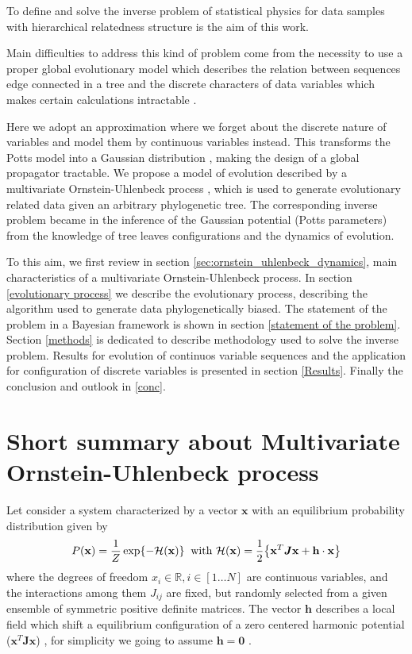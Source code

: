 \documentclass[reprint,amsmath,amssymb,superscriptaddress,showpacs,pre]{revtex4-1}
\let\originalleft\left
\let\originalright\right
\renewcommand{\left}{\mathopen{}\mathclose\bgroup\originalleft}
\renewcommand{\right}{\aftergroup\egroup\originalright}
\newcommand{\Ham}{\mathcal{H}}
\def\Jij{J_{ij}}
\begin{document}
 To define and solve the inverse problem of statistical physics for data samples with hierarchical  relatedness structure is the aim of this work. 

Main difficulties to address  this kind of problem  come from the necessity to use  a proper global evolutionary model which describes the relation between sequences edge connected in a tree and the discrete  characters of data variables which makes certain calculations intractable \cite{entropy_paper}. 

Here we  adopt an approximation where we forget about the discrete nature of variables and model them by continuous variables instead. This transforms the Potts model into a Gaussian distribution \cite{Baldassi}, making the design of a global propagator tractable. We propose a model of evolution described by a multivariate Ornstein-Uhlenbeck process \cite{gardiner}, which is used  to generate evolutionary related data given an arbitrary phylogenetic tree. The corresponding inverse problem became in the inference of the Gaussian potential (Potts parameters) from the knowledge of tree leaves configurations and the dynamics of evolution. 

To this aim, we first review in section \ref{sec:ornstein_uhlenbeck_dynamics}, main characteristics of a multivariate Ornstein-Uhlenbeck process. In section \ref{evolutionary process} we describe the evolutionary process, describing the algorithm used to generate data phylogenetically biased. The statement of the problem in a Bayesian framework is shown in section \ref{statement of the problem}. Section \ref{methods} is dedicated to describe methodology used to solve the inverse problem. Results for evolution of continuos variable sequences and  the application for configuration of discrete variables is presented in section \ref{Results}. Finally the conclusion and outlook in \ref{conc}.

\section{\label{sec:ornstein_uhlenbeck_dynamics}Short summary about Multivariate Ornstein-Uhlenbeck process}
Let consider a system characterized by a vector $\mathbf{x}$ with an equilibrium probability distribution given by
\begin{equation}
P(\mathbf{x}) =\frac 1 Z \exp \left\lbrace -\Ham(\mathbf{x}) \right\rbrace \;\; \mbox{with } \Ham(\mathbf{x}) =\frac{1}{2} \left\lbrace \mathbf{x}^T \bm J \mathbf{x}+ \mathbf{h} \cdot \mathbf{x} \right\rbrace \label{eq:equil}
\end{equation}
where the degrees of freedom $x_i \in \mathbb R, i\in [1\ldots N]$ are continuous variables, and the interactions among them $\Jij$ are fixed, but randomly selected 
from a given ensemble of symmetric positive definite matrices. The vector $\mathbf{h}$ describes a local field which shift a  equilibrium configuration of a zero centered   harmonic potential ($ \mathbf{x}^T \bm J \mathbf{x}$) , for simplicity we going to assume $\mathbf{h}=\mathbf{0}$ .
\end{document}
